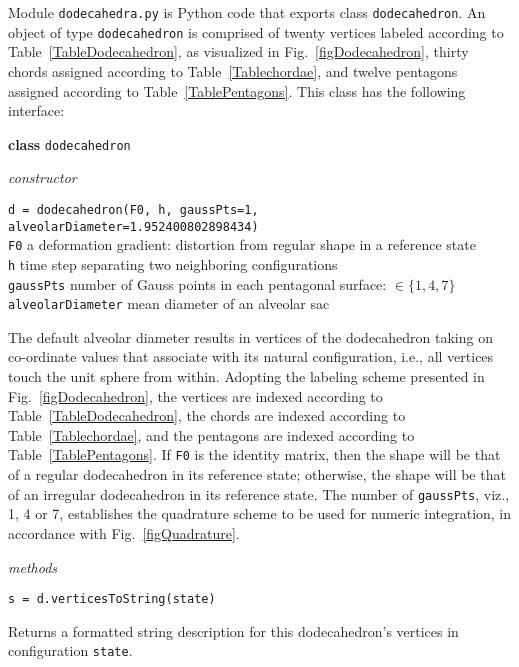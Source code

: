 \label{appDodecahedra}

Module \texttt{dodecahedra.py} is Python code that exports class \texttt{dodecahedron}.  An object of type \texttt{dodecahedron} is comprised of twenty vertices labeled according to Table~\ref{TableDodecahedron}, as visualized in Fig.~\ref{figDodecahedron}, thirty chords assigned according to Table~\ref{Tablechordae}, and twelve pentagons assigned according to Table~\ref{TablePentagons}.  This class has the following interface:

\noindent
\textbf{class} \texttt{dodecahedron}

\medskip\noindent
\textit{constructor}

\medskip\noindent
\texttt{d = dodecahedron(F0, h, gaussPts=1, alveolarDiameter=1.952400802898434)} \\
\indent \texttt{F0} \qquad\qquad a deformation gradient: distortion from regular shape in a reference state \\
\indent \texttt{h} \qquad\qquad\; time step separating two neighboring configurations \\
\indent \texttt{gaussPts} \quad number of Gauss points in each pentagonal surface: $\in \{ 1 , 4, 7 \}$ \\
\indent \texttt{alveolarDiameter} \; mean diameter of an alveolar sac

\medskip\noindent
The default alveolar diameter results in vertices of the dodecahedron taking on co-ordinate values that associate with its natural configuration, i.e., all vertices touch the unit sphere from within.  Adopting the labeling scheme presented in Fig.~\ref{figDodecahedron}, the vertices are indexed according to Table~\ref{TableDodecahedron}, the chords are indexed according to Table~\ref{Tablechordae}, and the pentagons are indexed according to Table~\ref{TablePentagons}.  If \texttt{F0} is the identity matrix, then the shape will be that of a regular dodecahedron in its reference state; otherwise, the shape will be that of an irregular dodecahedron in its reference state.  The number of \texttt{gaussPts}, viz., 1, 4 or 7, establishes the quadrature scheme to be used for numeric integration, in accordance with Fig.~\ref{figQuadrature}.

\medskip\noindent
\textit{methods}

\medskip\noindent
\texttt{s = d.verticesToString(state)}

\medskip\noindent
Returns a formatted string description for this dodecahedron's vertices in configuration \texttt{state}.

